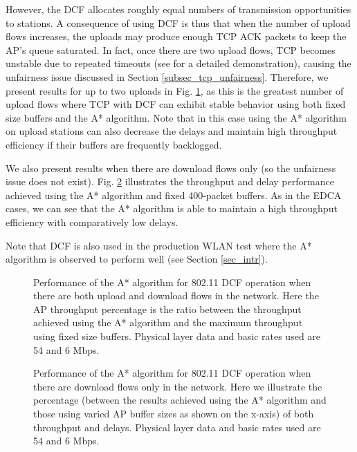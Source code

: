 \documentclass[10pt,twocolumn, journal]{IEEEtran}
\begin{document}
However, the DCF allocates roughly equal numbers of transmission opportunities to stations.  A consequence of using DCF is thus that when the number of upload flows increases, the uploads may produce enough TCP ACK packets to keep the AP's queue saturated. In fact, once there are two upload flows, TCP becomes unstable due to repeated timeouts (see \cite{David_winmee_2008} for a detailed demonstration), causing the unfairness issue discussed in Section \ref{subsec_tcp_unfairness}. Therefore, we present results for up to two uploads in Fig. \ref{fig_dcfvsastar}, as this is the greatest number of upload flows where TCP with DCF can exhibit stable behavior using both fixed size buffers and the A* algorithm. Note that in this case using the A* algorithm on upload stations can also decrease the delays and maintain high throughput efficiency if their buffers are frequently backlogged.

We also present results when there are download flows only (so the unfairness issue does not exist). Fig. \ref{fig_dcf} illustrates the throughput and delay performance achieved using the A* algorithm and fixed 400-packet buffers. As in the EDCA cases, we can see that the A* algorithm is able to maintain a high throughput efficiency with comparatively low delays.

Note that DCF is also used in the production WLAN test where the A* algorithm is observed to perform well (see Section \ref{sec_intr}).


\begin{figure}[tb]
   \centering
   \caption{Performance of the A* algorithm for 802.11 DCF operation when there are both upload and download flows in the network. Here the AP throughput percentage is the ratio between the throughput achieved using the A* algorithm and the maximum throughput using fixed size buffers. Physical layer data and basic rates used are 54 and 6 Mbps.}
   \label{fig_dcfvsastar}
\end{figure}


\begin{figure}[tb]
   \centering
   \caption{Performance of the A* algorithm for 802.11 DCF operation when there are download flows only in the network. Here we illustrate the percentage (between the results achieved using the A* algorithm and those using varied AP buffer sizes as shown on the x-axis) of both throughput and delays. Physical layer data and basic rates used are 54 and 6 Mbps. }
   \label{fig_dcf}
\end{figure}
\end{document}
